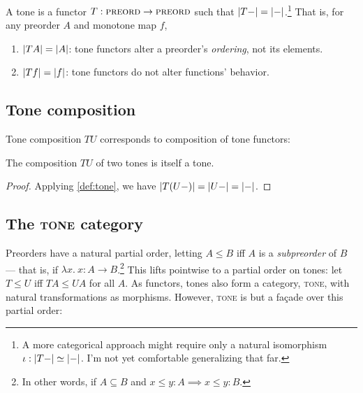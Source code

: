 \documentclass[ribbons]{rntz}
\newcommand{\fn}{\lambda}
\newcommand{\binder}{.~}
\newcommand{\bind}[1]{{#1}\binder}
\newcommand{\fnof}[1]{\fn\bind{#1}}
\newcommand{\cat}[1]{\textsc{#1}} %
\newcommand{\Pre}{\cat{preord}}
\newcommand{\Tone}{\cat{tone}}
\newcommand{\Cat}{\cat{cat}}
\newcommand\isoto{\simeq}
\begin{document}
\begin{definition}[Tones]\label{def:tone}
  A tone is a functor $T : \Pre \to \Pre$ such that $|{T-}| =
  |{-}|$.\footnote{A more categorical approach might require only a natural
    isomorphism \(\iota : \elems{T-} \isoto \elemsfn\). I'm not yet comfortable
    generalizing that far.} That is, for any preorder $A$ and monotone map $f$,
  \begin{enumerate}
  \item $|{TA}| = |{A}|$: tone functors alter a preorder's
    \emph{ordering}, not its elements.
  \item $|{Tf}| = |{f}|$: tone functors do not alter functions'
    behavior.
  \end{enumerate}
\end{definition}



\subsection{Tone composition}

Tone composition $TU$ corresponds to composition of tone functors:

\begin{theorem}
  The composition $TU$ of two tones is itself a tone.
\end{theorem}

\begin{proof} Applying \cref{def:tone}, we have
  \( |{T(U-)}| = |{U-}| = |{-}| \).
\end{proof}


\subsection{The \Tone{} category}

Preorders have a natural partial order, letting $A \le B$ iff $A$ is a
\emph{subpreorder} of $B$ --- that is, if $\fnof{x} x : A \to B$.\footnote{In
  other words, if $A \subseteq B$ and $x \le y : A \implies x \le y : B$.}
%
This lifts pointwise to a partial order on tones: let $T \le U$ iff
$TA \le UA$ for all $A$.
%
As functors, tones also form a category, \Tone{}, with natural transformations
as morphisms. However, \Tone{} is but a fa\c{c}ade over this partial order:
\end{document}
